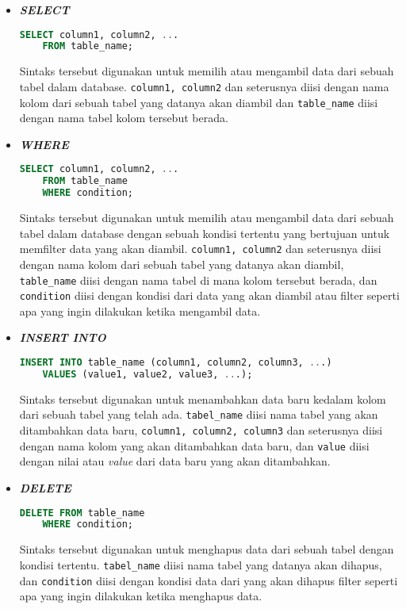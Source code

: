 \begin{itemize}
    \item \textbf{\textit{SELECT}}
    \begin{lstlisting}[language=SQL]
    SELECT column1, column2, ...
    FROM table_name;
    \end{lstlisting}
    Sintaks tersebut digunakan untuk memilih atau mengambil data dari sebuah tabel dalam database. \texttt{column1, column2} dan seterusnya diisi dengan nama kolom dari sebuah tabel yang datanya akan diambil dan \texttt{table\_name} diisi dengan nama tabel kolom tersebut berada.

    \item \textbf{\textit{WHERE}}
    \begin{lstlisting}[language=SQL]
    SELECT column1, column2, ...
    FROM table_name
    WHERE condition;
    \end{lstlisting}
    Sintaks tersebut digunakan untuk memilih atau mengambil data dari sebuah tabel dalam database dengan sebuah kondisi tertentu yang bertujuan untuk memfilter data yang akan diambil. \texttt{column1, column2} dan seterusnya diisi dengan nama kolom dari sebuah tabel yang datanya akan diambil, \texttt{table\_name} diisi dengan nama tabel di mana kolom tersebut berada, dan \texttt{condition} diisi dengan kondisi dari data yang akan diambil atau filter seperti apa yang ingin dilakukan ketika mengambil data.

    \item \textbf{\textit{INSERT INTO}}
    \begin{lstlisting}[language=SQL]
    INSERT INTO table_name (column1, column2, column3, ...)
    VALUES (value1, value2, value3, ...);
    \end{lstlisting}
    Sintaks tersebut digunakan untuk menambahkan data baru kedalam kolom dari sebuah tabel yang telah ada. \texttt{tabel\_name} diisi nama tabel yang akan ditambahkan data baru, \texttt{column1, column2, column3} dan seterusnya diisi dengan nama kolom yang akan ditambahkan data baru, dan \texttt{value} diisi dengan nilai atau \textit{value} dari data baru yang akan ditambahkan.

    \item \textbf{\textit{DELETE}}
    \begin{lstlisting}[language=SQL]
    DELETE FROM table_name
    WHERE condition;
    \end{lstlisting}
     Sintaks tersebut digunakan untuk menghapus data dari sebuah tabel dengan kondisi tertentu. \texttt{tabel\_name} diisi nama tabel yang datanya akan dihapus, dan \texttt{condition} diisi dengan kondisi data dari yang akan dihapus filter seperti apa yang ingin dilakukan ketika menghapus data.
\end{itemize}

